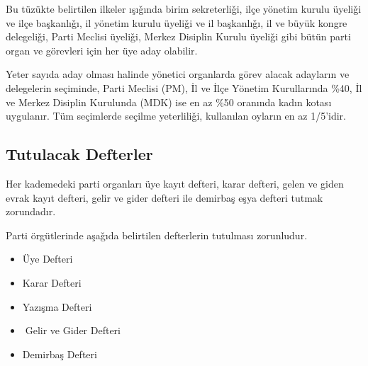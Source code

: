 \documentclass[11pt]{article} %
\begin{document}
Bu tüzükte belirtilen ilkeler ışıǧında birim sekreterliǧi, ilçe yönetim kurulu üyeliǧi ve ilçe başkanlıǧı, il yönetim kurulu üyeliǧi ve il başkanlıǧı, il ve büyük kongre delegeliǧi, Parti Meclisi üyeliǧi, Merkez Disiplin Kurulu üyeliǧi gibi bütün parti organ ve görevleri için her üye aday olabilir.

Yeter sayıda aday olması halinde yönetici organlarda görev alacak adayların ve delegelerin seçiminde, Parti Meclisi (PM), İl ve İlçe Yönetim Kurullarında \%40, İl ve Merkez Disiplin Kurulunda (MDK) ise en az \%50 oranında kadın kotası uygulanır.
Tüm seçimlerde seçilme yeterliliǧi, kullanılan oyların en az 1/5’idir.

\subsection{Tutulacak Defterler}
Her kademedeki parti organları üye kayıt defteri, karar defteri, gelen ve giden evrak kayıt defteri, gelir ve gider defteri ile demirbaş eşya defteri tutmak zorundadır.

Parti örgütlerinde aşaǧıda belirtilen defterlerin tutulması zorunludur.

\begin{itemize}
\item Üye Defteri
\item Karar Defteri
\item Yazışma Defteri
\item Gelir ve Gider Defteri
\item Demirbaş Defteri
\end{itemize}
\end{document}
